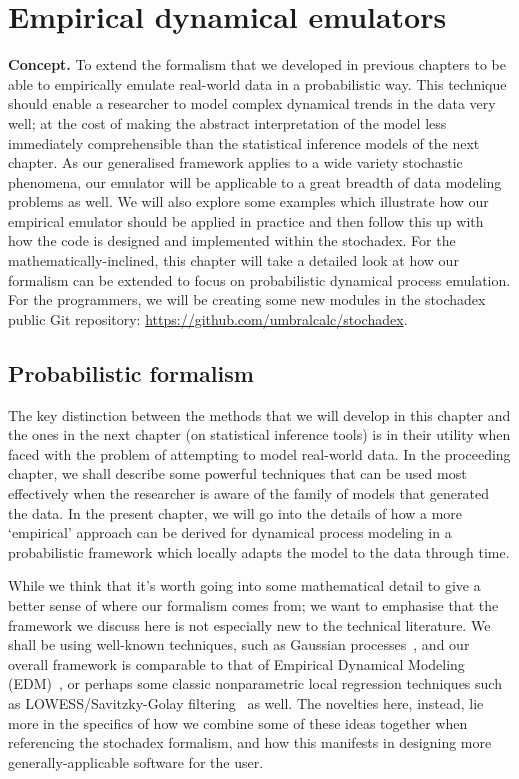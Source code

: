 \chapter{\sffamily Empirical dynamical emulators}

{\bfseries\sffamily Concept.} To extend the formalism that we developed in previous chapters to be able to empirically emulate real-world data in a probabilistic way. This technique should enable a researcher to model complex dynamical trends in the data very well; at the cost of making the abstract interpretation of the model less immediately comprehensible than the statistical inference models of the next chapter. As our generalised framework applies to a wide variety stochastic phenomena, our emulator will be applicable to a great breadth of data modeling problems as well. We will also explore some examples which illustrate how our empirical emulator should be applied in practice and then follow this up with how the code is designed and implemented within the stochadex. For the mathematically-inclined, this chapter will take a detailed look at how our formalism can be extended to focus on probabilistic dynamical process emulation. For the programmers, we will be creating some new modules in the stochadex public Git repository: \href{https://github.com/umbralcalc/stochadex}{https://github.com/umbralcalc/stochadex}.

\section{\sffamily Probabilistic formalism}

The key distinction between the methods that we will develop in this chapter and the ones in the next chapter (on statistical inference tools) is in their utility when faced with the problem of attempting to model real-world data. In the proceeding chapter, we shall describe some powerful techniques that can be used most effectively when the researcher is aware of the family of models that generated the data. In the present chapter, we will go into the details of how a more `empirical' approach can be derived for dynamical process modeling in a probabilistic framework which locally adapts the model to the data through time. 

While we think that it's worth going into some mathematical detail to give a better sense of where our formalism comes from; we want to emphasise that the framework we discuss here is not especially new to the technical literature. We shall be using  well-known techniques, such as Gaussian processes~\cite{murphy2012machine}, and our overall framework is comparable to that of Empirical Dynamical Modeling (EDM)~\cite{sugihara1990nonlinear}, or perhaps some classic nonparametric local regression techniques such as LOWESS/Savitzky-Golay filtering~\cite{savitzky1964smoothing} as well. The novelties here, instead, lie more in the specifics of how we combine some of these ideas together when referencing the stochadex formalism, and how this manifests in designing more generally-applicable software for the user.

